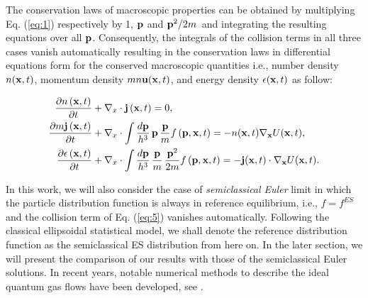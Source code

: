 \documentclass{rsproca}%
\begin{document}
The conservation laws of macroscopic properties can be obtained by multiplying Eq. (\ref{eq:1}) respectively by 1, ${\bf p}$ and \({\bf p}^2/2m\)\, and integrating the resulting equations over all ${\bf p}$.  Consequently, the integrals of the collision terms in all three cases vanish automatically resulting in the conservation laws in differential equations form for the conserved macroscopic quantities i.e., number density \(n({\bf x},t)\), momentum density \(m n {\bf u}({\bf x},t)\), and energy density \(\epsilon({\bf x},t)\) as follow:

\begin{align}
\frac{\partial n\left({\bf x},t\right)}{\partial t}&+{\bf \nabla }_x\cdot{\bf j}\left({\bf x},t\right)=0, \\
\frac{\partial m\/{\bf j}\left({\bf x},t\right)}{\partial t}&+{\bf \nabla }_x\cdot\int{\frac{d{\bf p}}{h^3}}\,{\bf p}\,\frac{\bf p}{m}f\left({\bf p},{\bf x},t\right)= -n({\bf x},t){\bf \nabla}_{\bf x}U({\bf x},t), \\
\frac{\partial \epsilon \left({\bf x},t\right)}{\partial t}&+{\bf \nabla }_x\cdot\int{\frac{d\bf p}{h^3}}\,\frac{\bf p}{m}\,\frac{{\bf p}^2}{2m}f\left({\bf p},{\bf x},t\right)=-{\bf j}({\bf x},t)\cdot{\bf \nabla}_{\bf x}U({\bf x},t).
\end{align}

In this work, we will also consider the case of {\em semiclassical Euler} limit in which the particle distribution function is always in reference equilibrium, i.e., $f=f^{ES}$ and the collision term of Eq. (\ref{eq:5}) vanishes automatically.  Following the classical ellipsoidal statistical model, we shall denote the reference distribution function as the semiclassical ES distribution from here on.  In the later section, we will present the comparison of our results with those of the semiclassical Euler solutions.  In recent years, notable numerical methods to describe the ideal quantum gas flows have been developed, see \cite{1272832,Shi20089389,Jaw-YenYang05082006}.
\end{document}
